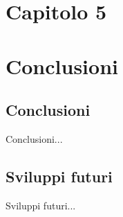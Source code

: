 \documentclass[12pt,italian]{report}
\begin{document}
% 
% 

\chapter{Capitolo 5}
\label{chap:risultati}


% 
% 

\chapter{Conclusioni}
\label{cap6}

\section{Conclusioni}

Conclusioni...

\section{Sviluppi futuri}

Sviluppi futuri...



%
%



\end{document}
